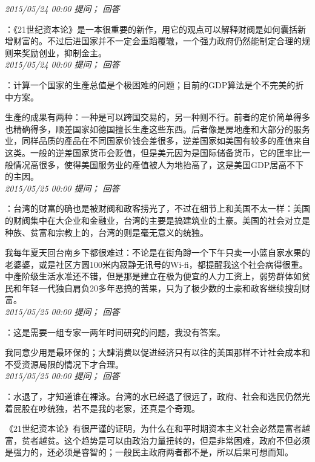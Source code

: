 \documentclass[twocolumn]{ctexart}
\begin{document}
\textit{\hfill\noindent\small 2015/05/24 00:00 提问； 回答}

：《21世纪资本论》是一本很重要的新作，用它的观点可以解释财阀是如何囊括新增财富的。不过后进国家并不一定会重蹈覆辙，一个强力政府仍然能制定合理的规则来奖励创业，抑制金主。\\

\textit{\hfill\noindent\small 2015/05/24 00:00 提问； 回答}

：计算一个国家的生產总值是个极困难的问题；目前的GDP算法是个不完美的折中方案。

生產的成果有两种：一种是可以跨国交易的，另一种则不行。前者的定价简单得多也精确得多，顺差国家如德国擅长生產这些东西。后者像是房地產和大部分的服务业，同样品质的產品在不同国家价钱会差很多，逆差国家如美国有较多的產值来自这类。一般的逆差国家货币会贬值，但是美元因为是国际储备货币，它的匯率比一般情况高很多，使得美国服务业的產值被人为地抬高了，这是美国GDP居高不下的主因。\\

\textit{\hfill\noindent\small 2015/05/25 00:00 提问； 回答}

：台湾的财富的确也是被财阀和政客捞光了，不过在细节上和美国不太一样：美国的财阀集中在大企业和金融业，台湾的主要是搞建筑业的土豪。美国的社会对立是种族、贫富和宗教上的，台湾的则是毫无意义的统独。

我每年夏天回台南乡下都很难过：不论是在街角蹲一个下午只卖一小篮自家水果的老婆婆，或是社区方圆100米内寂静无讯号的Wi-fi，都提醒我这个社会病得很重。中產阶级生活水准还不错，但是那是建立在极为便宜的人力工资上，弱势群体如贫民和年轻一代独自肩负20多年恶搞的苦果，只为了极少数的土豪和政客继续搜刮财富。\\

\textit{\hfill\noindent\small 2015/05/25 00:00 提问； 回答}

：这是需要一组专家一两年时间研究的问题，我没有答案。

我同意少用是最环保的；大肆消费以促进经济只有以往的美国那样不计社会成本和不受资源局限的情况下才合理。\\

\textit{\hfill\noindent\small 2015/05/25 00:00 提问； 回答}

：水退了，才知道谁在裸泳。台湾的水已经退了很远了，政府、社会和选民仍然光着屁股在吵统独，若不是我的老家，还真是个奇观。

《21世纪资本论》有很严谨的证明，为什么在和平时期资本主义社会必然是富者越富，贫者越贫。这个趋势是可以由政治力量扭转的，但是非常困难，政府不但必须是强力的，还必须是睿智的；一般民主政府两者都不是，所以后果可想而知。\\
\end{document}
